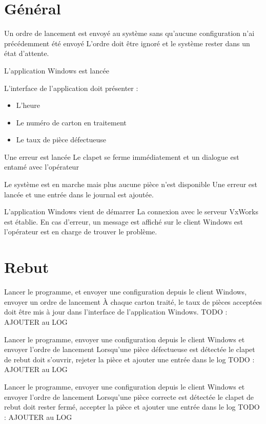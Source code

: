\section{Général}

{Un ordre de lancement est envoyé au système sans qu'aucune configuration n'ai précédemment été envoyé}
{L'ordre doit être ignoré et le système rester dans un état d'attente.}

{L'application Windows est lancée}
{L'interface de l'application doit présenter :
\begin{itemize}
	\item L'heure
	\item Le numéro de carton en traitement
	\item Le taux de pièce défectueuse
\end{itemize}
}

{Une erreur est lancée}
{Le clapet se ferme immédiatement et un dialogue est entamé avec l'opérateur}

{Le système est en marche mais plus aucune pièce n'est disponible}
{Une erreur est lancée et une entrée dans le journal est ajoutée.}

{L'application Windows vient de démarrer}
{La connexion avec le serveur VxWorks est établie. En cas d'erreur, un message est affiché sur le client Windows est l'opérateur est en charge de trouver le problème.}

\section{Rebut}
{Lancer le programme, et envoyer une configuration depuis le client Windows, envoyer un ordre de lancement}
{À chaque carton traité, le taux de pièces acceptées doit être mis à jour dans l'interface de l'application Windows.}
TODO : AJOUTER au LOG

{Lancer le programme, envoyer une configuration depuis le client Windows et envoyer l'ordre de lancement}
{Lorsqu'une pièce défectueuse est détectée le clapet de rebut doit s'ouvrir, rejeter la pièce et ajouter une entrée dans le log}
TODO : AJOUTER au LOG

{Lancer le programme, envoyer une configuration depuis le client Windows et envoyer l'ordre de lancement}
{Lorsqu'une pièce correcte est détectée le clapet de rebut doit rester fermé, accepter la pièce et ajouter une entrée dans le log}
TODO : AJOUTER au LOG

